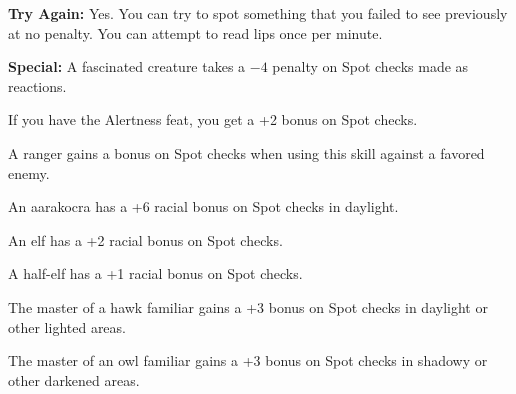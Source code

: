\textbf{Try Again:} Yes. You can try to spot something that you failed to see previously at no penalty. You can attempt to read lips once per minute.

\textbf{Special:} A fascinated creature takes a $-4$ penalty on Spot checks made as reactions.

If you have the Alertness feat, you get a +2 bonus on Spot checks.

A ranger gains a bonus on Spot checks when using this skill against a favored enemy.

An aarakocra has a +6 racial bonus on Spot checks in daylight.

An elf has a +2 racial bonus on Spot checks.

A half-elf has a +1 racial bonus on Spot checks.

The master of a hawk familiar gains a +3 bonus on Spot checks in daylight or other lighted areas.

The master of an owl familiar gains a +3 bonus on Spot checks in shadowy or other darkened areas.

